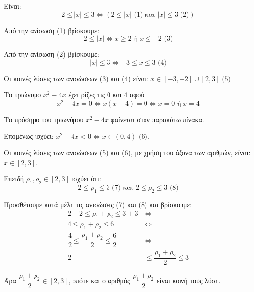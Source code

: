 
\begin{alist}
\item Είναι:
\[2 \le |x| \le 3 \Leftrightarrow (2 \le |x| \text{ (1) και } |x| \le 3 \text{ (2)})\]

Από την ανίσωση (1) βρίσκουμε:
\[2 \le |x| \Leftrightarrow x \ge 2 \text{ ή } x \le -2 \text{ (3)}\]

Από την ανίσωση (2) βρίσκουμε:
\[|x| \le 3 \Leftrightarrow -3 \le x \le 3 \text{ (4)}\]

Οι κοινές λύσεις των ανισώσεων (3) και (4) είναι: $x \in [-3, -2] \cup [2, 3] \text{ (5)}$

Το τριώνυμο $x^2 - 4x$ έχει ρίζες τις $0$ και $4$ αφού:
\[x^2 - 4x = 0 \Leftrightarrow x(x - 4) = 0 \Leftrightarrow x = 0 \text{ ή } x = 4\]

Το πρόσημο του τριωνύμου $x^2 - 4x$ φαίνεται στον παρακάτω πίνακα.

\begin{center}
\end{center}

Επομένως ισχύει: $x^2 - 4x < 0 \Leftrightarrow x \in (0, 4) \text{ (6)}$.

\item Οι κοινές λύσεις των ανισώσεων (5) και (6), με χρήση του άξονα των αριθμών, είναι: $x \in [2, 3]$.

\item Επειδή $\rho_1, \rho_2 \in [2, 3]$ ισχύει ότι:
\[2 \le \rho_1 \le 3 \text{ (7) και } 2 \le \rho_2 \le 3 \text{ (8)}\]

Προσθέτουμε κατά μέλη τις ανισώσεις (7) και (8) και βρίσκουμε:
\begin{align*}
2 + 2 \le \rho_1 + \rho_2 \le 3 + 3 \ &\Leftrightarrow \\
4 \le \rho_1 + \rho_2 \le 6 \ &\Leftrightarrow \\
\dfrac{4}{2} \le \dfrac{\rho_1 + \rho_2}{2} \le \dfrac{6}{2} \ &\Leftrightarrow \\
2 &\le \dfrac{\rho_1 + \rho_2}{2} \le 3
\end{align*}

Άρα $\dfrac{\rho_1 + \rho_2}{2} \in [2, 3]$, οπότε και ο αριθμός $\dfrac{\rho_1 + \rho_2}{2}$ είναι κοινή τους λύση.
\end{alist}

